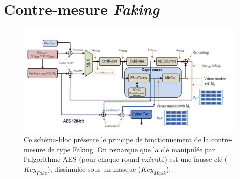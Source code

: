 \documentclass[10pt, oneside, a4paper]{article}
\begin{document}
\newpage

\section{Contre-mesure \textit{Faking}}
\label{ann:ConceptFaking}
\begin{figure}[htb]
    \centering
    \includegraphics[width=\linewidth]{image/ConceptFaking}
    \caption{Ce schéma-bloc présente le principe de fonctionnement de la contre-mesure de type Faking. On remarque que la clé manipulée par l'algorithme AES (pour chaque round exécuté) est une fausse clé ($Key_{Fake}$), dissimulée sous un masque ($Key_{Mask}$).}
    \label{fig:ConceptFaking} 
\end{figure}

\newpage



\newpage


\end{document}
